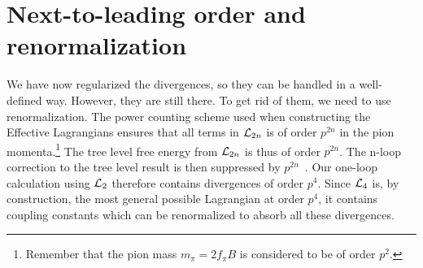 \section{Next-to-leading order and renormalization}
We have now regularized the divergences, so they can be handled in a well-defined way.
However, they are still there.
To get rid of them, we need to use renormalization.
The power counting scheme used when constructing the Effective Lagrangians ensures that all terms in $\mathcal{L}_{2n}$ is of order $p^{2n}$ in the pion momenta.\footnote{Remember that the pion mass $m_\pi = 2 f_\pi B$ is considered to be of order $p^2$.}
The tree level free energy from $\mathcal{L}_{2n}$ is thus of order $p^{2n}$.
The n-loop correction to the tree level result is then suppressed by $p^{2n}$~\cite{Gasser-Leutwyler:chiral,WeinbergPhenom}.
Our one-loop calculation using $\mathcal{L}_2$ therefore contains divergences of order $p^{4}$. 
Since $\mathcal{L}_4$ is, by construction, the most general possible Lagrangian at order $p^4$, it contains coupling constants which can be renormalized to absorb all these divergences.

